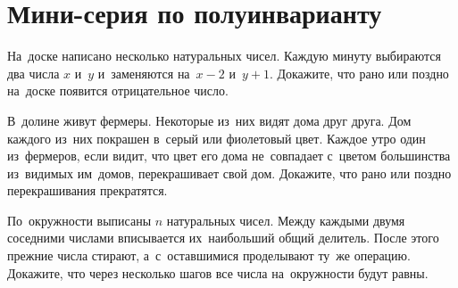 

\section*{Мини-серия по полуинварианту}


\begin{problems}

\item
На~доске написано несколько натуральных чисел.
Каждую минуту выбираются два числа $x$ и~$y$ и~заменяются на~$x - 2$ и~$y + 1$.
Докажите, что рано или поздно на~доске появится отрицательное число.

\item
В~долине живут фермеры.
Некоторые из~них видят дома друг друга.
Дом каждого из~них покрашен в~серый или фиолетовый цвет.
Каждое утро один из~фермеров, если видит, что цвет его дома не~совпадает с~цветом
большинства из~видимых им~домов, перекрашивает свой дом.
Докажите, что рано или поздно перекрашивания прекратятся.

\item
По~окружности выписаны $n$ натуральных чисел.
Между каждыми двумя соседними числами вписывается их~наибольший общий делитель.
После этого прежние числа стирают, а~с~оставшимися проделывают ту~же операцию.
Докажите, что через несколько шагов все числа на~окружности будут равны.

\end{problems}

